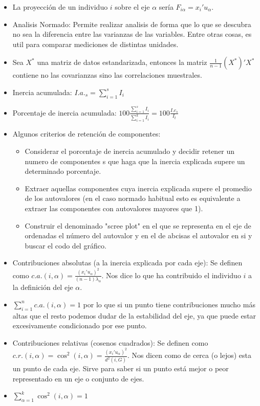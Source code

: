 \documentclass{article}
\begin{document}
\begin{itemize}
    \item La proyección de un individuo $i$ sobre el eje $\alpha$ sería $F_{i\alpha} = x_i'u_\alpha$.
    \item Analisis Normado: Permite realizar analisis de forma que lo que se descubra no sea la diferencia entre las varianzas de las variables. Entre otras cosas, es util para comparar mediciones de distintas unidades.
    \item Sea $X^*$ una matriz de datos estandarizada, entonces la matriz $\frac{1}{n-1}(X^*)'X^*$ contiene no las covarianzas sino las correlaciones muestrales.
    \item Inercia acumulada: $I.a._s = \sum_{i=1}^{s}I_i$
    \item Porcentaje de inercia acumulada: $100\frac{\sum_{i=1}^{s}I_i}{\sum_{i=1}^{k}I_i} = 100\frac{I.c_s}{I_t}$
    \item Algunos criterios de retención de componentes:
          \begin{itemize}
              \item Considerar el porcentaje de inercia acumulado y decidir retener un numero de componentes s que haga que la inercia explicada supere un determinado porcentaje.
              \item Extraer aquellas componentes cuya inercia explicada supere el promedio de los autovalores (en el caso normado habitual esto es equivalente a extraer las componentes con autovalores mayores que 1).
              \item Construir el denominado "scree plot" en el que se representa en el eje de ordenadas el número del autovalor y en el de abcisas el autovalor en si y buscar el codo del gráfico.
          \end{itemize}
    \item Contribuciones absolutas (a la inercia explicada por cada eje): Se definen como $c.a.(i,\alpha)=\frac{(x_i'u_\alpha)^2}{(n-1)\lambda_\alpha}$. Nos dice lo que ha contribuido el individuo $i$ a la definición del eje $\alpha$.
    \item $\sum_{i=1}^{n}c.a.(i,\alpha)=1$ por lo que si un punto tiene contribuciones mucho más altas que el resto podemos dudar de la estabilidad del eje, ya que puede estar excesivamente condicionado por ese punto.
    \item Contribuciones relativas (cosenos cuadrados): Se definen como $c.r.(i,\alpha)=\cos^2(i,\alpha)=\frac{(x_i'u_\alpha)^2}{d^2(i,G)}$. Nos dicen como de cerca (o lejos) esta un punto de cada eje. Sirve para saber si un punto está mejor o peor representado en un eje o conjunto de ejes.
    \item $\sum_{\alpha=1}^{k}\cos^2(i,\alpha)=1$
\end{itemize}
\end{document}
